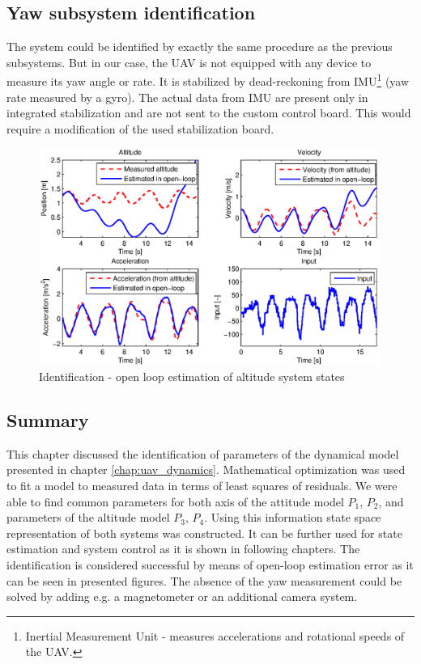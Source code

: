 \subsection{Yaw subsystem identification}

The system could be identified by exactly the same procedure as the previous subsystems. But in our case, the UAV is not equipped with any device to measure its yaw angle or rate. It is stabilized by dead-reckoning from IMU\footnote{Inertial Measurement Unit - measures accelerations and rotational speeds of the UAV.} (yaw rate measured by a gyro). The actual data from IMU are present only in integrated stabilization and are not sent to the custom control board. This would require a modification of the used stabilization board.

\begin{figure}[h]
\includegraphics[width=0.99\textwidth]{fig/iden4.eps} 
\caption{Identification - open loop estimation of altitude system states}
\label{fig:iden4}
\end{figure}

\subsection{Summary}

This chapter discussed the identification of parameters of the dynamical model presented in chapter \ref{chap:uav_dynamics}. Mathematical optimization was used to fit a model to measured data in terms of least squares of residuals. We were able to find common parameters for both axis of the attitude model $P_1$, $P_2$, and parameters of the altitude model $P_3$, $P_4$. Using this information state space representation of both systems was constructed. It can be further used for state estimation and system control as it is shown in following chapters. The identification is considered successful by means of open-loop estimation error as it can be seen in presented figures. The absence of the yaw measurement could be solved by adding e.g. a magnetometer or an additional camera system.